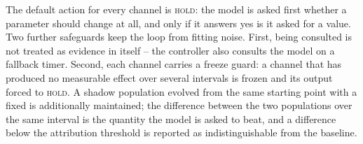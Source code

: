 The default action for every channel is \textsc{hold}: the model is asked first
whether a parameter should change at all, and only if it answers yes is it asked
for a value. Two further safeguards keep the loop from fitting noise. First,
being consulted is not treated as evidence in itself -- the controller also
consults the model on a fallback timer. Second, each channel carries a freeze
guard: a channel that has produced no measurable effect over several intervals
is frozen and its output forced to \textsc{hold}. A shadow population evolved
from the same starting point with a fixed \CR{} is additionally maintained; the
difference between the two populations over the same interval is the quantity
the model is asked to beat, and a difference below the attribution threshold is
reported as indistinguishable from the baseline.

